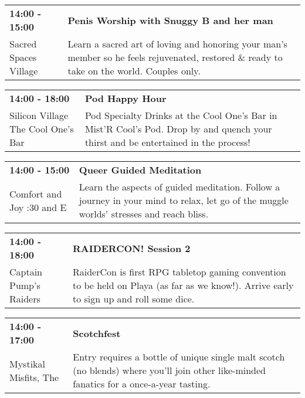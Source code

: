 \begin{tabular}{ p{1in} p{2.2in} }
    \textbf{14:00 - 15:00} & \textbf{Penis Worship with Snuggy B and her man} \\
    Sacred Spaces Village \newline  & Learn a sacred art of loving and honoring your man's member so he feels rejuvenated, restored \& ready to take on the world. Couples only. \\
    \hline 
\end{tabular}
    
\begin{tabular}{ p{1in} p{2.2in} }
    \textbf{14:00 - 18:00} & \textbf{Pod Happy Hour} \\
    Silicon Village \newline The Cool One's Bar & Pod Specialty Drinks at the Cool One's Bar in Mist'R Cool's Pod.
Drop by and quench your thirst and be entertained in the process! \\
    \hline 
\end{tabular}
    
\begin{tabular}{ p{1in} p{2.2in} }
    \textbf{14:00 - 15:00} & \textbf{Queer Guided Meditation} \\
    Comfort and Joy \newline 7:30 and E & Learn the aspects of guided meditation.   Follow a journey in your mind to relax, let go of the muggle worlds' stresses and reach bliss. \\
    \hline 
\end{tabular}
    
\begin{tabular}{ p{1in} p{2.2in} }
    \textbf{14:00 - 18:00} & \textbf{RAIDERCON! Session 2} \\
    Captain Pump's Raiders \newline  & RaiderCon is first RPG tabletop gaming convention to be held on Playa (as far as we know!). Arrive early to sign up and roll some dice. \\
    \hline 
\end{tabular}
    
\begin{tabular}{ p{1in} p{2.2in} }
    \textbf{14:00 - 17:00} & \textbf{Scotchfest} \\
    Mystikal Misfits, The \newline  & Entry requires a bottle of unique single malt scotch (no blends) where you'll join other like-minded fanatics for a once-a-year tasting. \\
    \hline 
\end{tabular}
    
